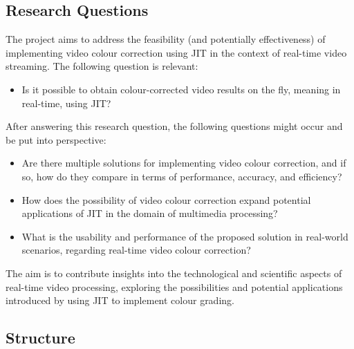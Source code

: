 \documentclass[12pt,a4paper]{article}
\begin{document}
\subsection{Research Questions}

The project aims to address the feasibility (and potentially effectiveness) of implementing video colour correction using JIT in the context of real-time video streaming. The following question is relevant:

\begin{itemize}
	\item Is it possible to obtain colour-corrected video results on the fly, meaning in real-time, using JIT?
\end{itemize}

After answering this research question, the following questions might occur and be put into perspective:

\begin{itemize}
	\item Are there multiple solutions for implementing video colour correction, and if so, how do they compare in terms of performance, accuracy, and efficiency?
	\item How does the possibility of video colour correction expand potential applications of JIT in the domain of multimedia processing?
	\item What is the usability and performance of the proposed solution in real-world scenarios, regarding real-time video colour correction?
\end{itemize}

The aim is to contribute insights into the technological and scientific aspects of real-time video processing, exploring the possibilities and potential applications introduced by using JIT to implement colour grading. 










\subsection{Structure}
\end{document}
